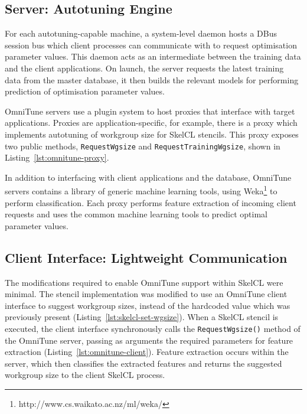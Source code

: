 \subsection{Server: Autotuning Engine}

For each autotuning-capable machine, a system-level daemon hosts a
DBus session bus which client processes can communicate with to
request optimisation parameter values. This daemon acts as an
intermediate between the training data and the client applications. On
launch, the server requests the latest training data from the master
database, it then builds the relevant models for performing prediction
of optimisation parameter values.

OmniTune servers use a plugin system to host proxies that interface
with target applications. Proxies are application-specific, for
example, there is a proxy which implements autotuning of workgroup
size for SkelCL stencils. This proxy exposes two public methods,
\texttt{RequestWgsize} and \texttt{RequestTrainingWgsize}, shown in
Listing~\ref{lst:omnitune-proxy}.

In addition to interfacing with client applications and the database,
OmniTune servers contains a library of generic machine learning tools,
using Weka\footnote{http://www.cs.waikato.ac.nz/ml/weka/} to perform
classification. Each proxy performs feature extraction of incoming
client requests and uses the common machine learning tools to predict
optimal parameter values.




\subsection{Client Interface: Lightweight Communication}

The modifications required to enable OmniTune support within SkelCL
were minimal. The stencil implementation was modified to use an
OmniTune client interface to suggest workgroup sizes, instead of the
hardcoded value which was previously present
(Listing~\ref{lst:skelcl-set-wgsize}). When a SkelCL stencil is
executed, the client interface synchronously calls the
\texttt{RequestWgsize()} method of the OmniTune server, passing as
arguments the required parameters for feature extraction
(Listing~\ref{lst:omnitune-client}). Feature extraction occurs within
the server, which then classifies the extracted features and returns
the suggested workgroup size to the client SkelCL process.

